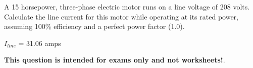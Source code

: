 

A 15 horsepower, three-phase electric motor runs on a line voltage of 208 volts.  Calculate the line current for this motor while operating at its rated power, assuming 100\% efficiency and a perfect power factor (1.0).







$I_{line}$ = 31.06 amps







{\bf This question is intended for exams only and not worksheets!}.


